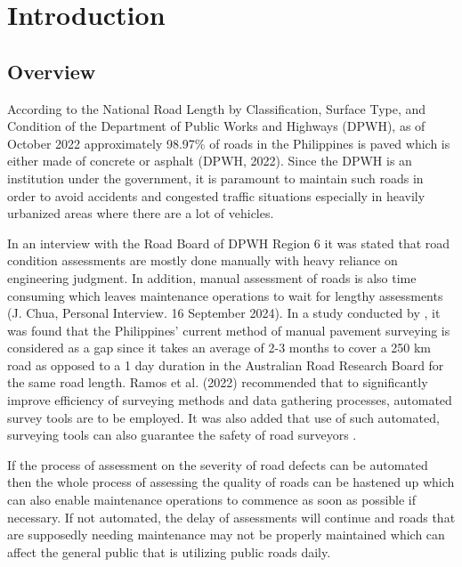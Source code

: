 \chapter{Introduction}
\label{sec:researchdesc}    %

\section{Overview}
\label{sec:overview}

According to the National Road Length by Classification, Surface Type, and Condition of the Department of Public Works and Highways (DPWH), as of October 2022 approximately 98.97\% of roads in the Philippines is paved which is either made of concrete or asphalt (DPWH, 2022). Since the DPWH is an institution under the government, it is paramount to maintain such roads in order to avoid accidents and congested traffic situations especially in heavily urbanized areas where there are a lot of vehicles.

In an interview with the Road Board of DPWH Region 6 it was stated that road condition assessments are mostly done manually with heavy reliance on engineering judgment. In addition, manual assessment of roads is also time consuming which leaves maintenance operations to wait for lengthy assessments (J. Chua, Personal Interview. 16 September 2024).  In a study conducted by \cite{ramos2023}, it was found that the Philippines’ current method of manual pavement surveying is considered as a gap since it takes an average of 2-3 months to cover a 250 km road as opposed to a 1 day duration in the Australian Road Research Board for the same road length. Ramos et al. (2022) recommended that to significantly improve efficiency of surveying methods and data gathering processes, automated survey tools are to be employed. It was also added that use of such automated, surveying tools can also guarantee the safety of road surveyors \cite{ramos2023}.

If the process of assessment on the severity of road defects can be automated then the whole process of assessing the quality of roads can be hastened up which can also enable maintenance operations to commence as soon as possible if necessary. If not automated, the delay of assessments will continue and roads that are supposedly needing maintenance may not be properly maintained which can affect the general public that is utilizing public roads daily.

